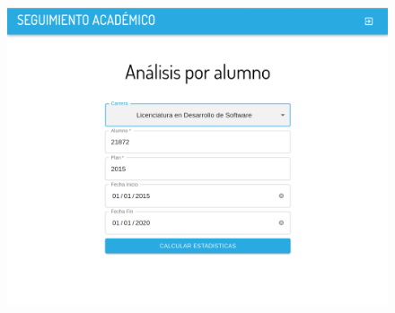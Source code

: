 \begin{figure}[!htbp]
  \centering
    \includegraphics[scale=0.3]{images/seguimiento-academico/sa-form-alumno.png}
  \label{fig:sa-alumno}
\end{figure}